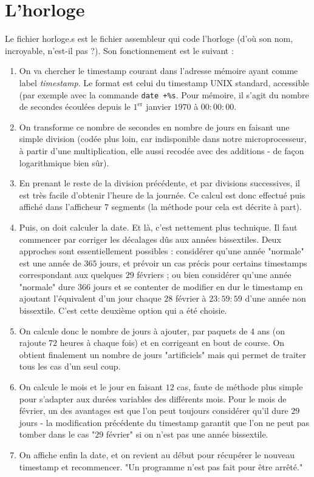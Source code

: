 \documentclass[13pt]{article}
\begin{document}
\section{L'horloge}

Le fichier horloge.s est le fichier assembleur qui code l'horloge (d'où son nom,
incroyable, n'est-il pas ?). Son fonctionnement est le suivant :

\begin{enumerate}
\item On va chercher le timestamp courant dans l'adresse mémoire ayant comme label
   \emph{timestamp}. Le format est celui du timestamp UNIX standard, accessible (par
   exemple avec la commande \texttt{date +\%s}. Pour mémoire, il s'agit du nombre de
   secondes écoulées depuis le $1^{\text{er}}$ janvier $1970$ à $00:00:00$.\\
\item On transforme ce nombre de secondes en nombre de jours en faisant une simple
   division (codée plus loin, car indisponible dans notre microprocesseur, à
   partir d'une multiplication, elle aussi recodée avec des additions - de façon
   logarithmique bien sûr).\\
\item En prenant le reste de la division précédente, et par divisions successives,
   il est très facile d'obtenir l'heure de la journée. Ce calcul est donc
   effectué puis affiché dans l'afficheur $7$ segments (la méthode pour cela est
   décrite à part).\\
\item Puis, on doit calculer la date. Et là, c'est nettement plus technique. Il
   faut commencer par corriger les décalages dûs aux années bissextiles. Deux
   approches sont essentiellement possibles : considérer qu'une année "normale"
   est une année de $365$ jours, et prévoir un cas précis pour certains timestamps
   correspondant aux quelques $29$ févriers ; ou bien considérer qu'une année
   "normale" dure $366$ jours et se contenter de modifier en dur le timestamp en
   ajoutant l'équivalent d'un jour chaque $28$ février à $23:59:59$ d'une année non
   bissextile. C'est cette deuxième option qui a été choisie.\\
\item On calcule donc le nombre de jours à ajouter, par paquets de $4$ ans (on
   rajoute $72$ heures à chaque fois) et en corrigeant en bout de course. On
   obtient finalement un nombre de jours
   "artificiels" mais qui permet de traiter tous les cas d'un seul coup.
\item On calcule le mois et le jour en faisant $12$ cas, faute de méthode plus simple
   pour s'adapter aux durées variables des différents mois. Pour le mois de
   février, un des avantages est que l'on peut toujours considérer qu'il dure $29$
   jours - la modification précédente du timestamp garantit que l'on ne peut pas
   tomber dans le cas "$29$ février" si on n'est pas une année bissextile.
\item On affiche enfin la date, et on revient au début pour récupérer le nouveau
   timestamp et recommencer. "Un programme n'est pas fait pour être arrêté."
\end{enumerate}
\end{document}
